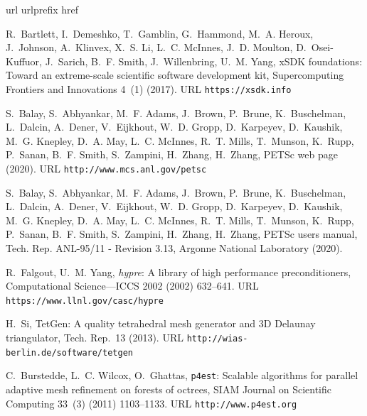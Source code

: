 \documentclass[3p,11pt]{elsarticle}
\begin{document}

\begin{thebibliography}{10}
\expandafter\ifx\csname url\endcsname\relax
  \def\url#1{\texttt{#1}}\fi
\expandafter\ifx\csname urlprefix\endcsname\relax\def\urlprefix{URL }\fi
\expandafter\ifx\csname href\endcsname\relax
  \def\href#1#2{#2} \def\path#1{#1}\fi

R.~Bartlett, I.~Demeshko, T.~Gamblin, G.~Hammond, M.~A. Heroux, J.~Johnson,
  A.~Klinvex, X.~S. Li, L.~C. McInnes, J.~D. Moulton, D.~Osei-Kuffuor,
  J.~Sarich, B.~F. Smith, J.~Willenbring, U.~M. Yang,
  \href{https://xsdk.info}{{xSDK} foundations: Toward an extreme-scale
  scientific software development kit}, Supercomputing Frontiers and
  Innovations 4~(1) (2017).
\newline\urlprefix\url{https://xsdk.info}

S.~Balay, S.~Abhyankar, M.~F. Adams, J.~Brown, P.~Brune, K.~Buschelman,
  L.~Dalcin, A.~Dener, V.~Eijkhout, W.~D. Gropp, D.~Karpeyev, D.~Kaushik, M.~G.
  Knepley, D.~A. May, L.~C. McInnes, R.~T. Mills, T.~Munson, K.~Rupp, P.~Sanan,
  B.~F. Smith, S.~Zampini, H.~Zhang, H.~Zhang,
  \href{http://www.mcs.anl.gov/petsc}{{PETS}c web page} (2020).
\newline\urlprefix\url{http://www.mcs.anl.gov/petsc}

S.~Balay, S.~Abhyankar, M.~F. Adams, J.~Brown, P.~Brune, K.~Buschelman,
  L.~Dalcin, A.~Dener, V.~Eijkhout, W.~D. Gropp, D.~Karpeyev, D.~Kaushik, M.~G.
  Knepley, D.~A. May, L.~C. McInnes, R.~T. Mills, T.~Munson, K.~Rupp, P.~Sanan,
  B.~F. Smith, S.~Zampini, H.~Zhang, H.~Zhang, {PETS}c users manual, Tech. Rep.
  ANL-95/11 - Revision 3.13, Argonne National Laboratory (2020).

R.~Falgout, U.~M. Yang, \href{https://www.llnl.gov/casc/hypre}{\emph{hypre}: A
  library of high performance preconditioners}, Computational Science---ICCS
  2002 (2002) 632--641.
\newline\urlprefix\url{https://www.llnl.gov/casc/hypre}

H.~Si, \href{http://wias-berlin.de/software/tetgen}{{TetGen}: A quality
  tetrahedral mesh generator and {3D D}elaunay triangulator}, Tech. Rep.~13
  (2013).
\newline\urlprefix\url{http://wias-berlin.de/software/tetgen}

C.~Burstedde, L.~C. Wilcox, O.~Ghattas,
  \href{http://www.p4est.org}{{\texttt{p4est}}: Scalable algorithms for
  parallel adaptive mesh refinement on forests of octrees}, SIAM Journal on
  Scientific Computing 33~(3) (2011) 1103--1133.
\newline\urlprefix\url{http://www.p4est.org}


\end{thebibliography}
\end{document}
